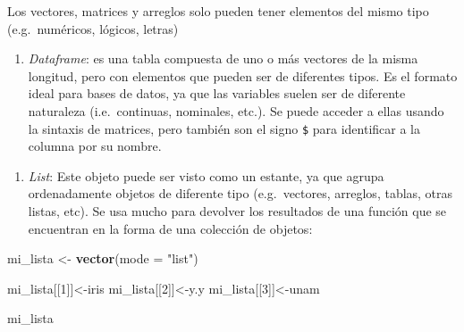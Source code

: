 \documentclass[]{article}
\newenvironment{Shaded}{\begin{snugshade}}{\end{snugshade}}
\newcommand{\CommentTok}[1]{\textcolor[rgb]{0.56,0.35,0.01}{\textit{#1}}}
\newcommand{\DataTypeTok}[1]{\textcolor[rgb]{0.13,0.29,0.53}{#1}}
\newcommand{\DecValTok}[1]{\textcolor[rgb]{0.00,0.00,0.81}{#1}}
\newcommand{\KeywordTok}[1]{\textcolor[rgb]{0.13,0.29,0.53}{\textbf{#1}}}
\newcommand{\NormalTok}[1]{#1}
\newcommand{\OperatorTok}[1]{\textcolor[rgb]{0.81,0.36,0.00}{\textbf{#1}}}
\newcommand{\StringTok}[1]{\textcolor[rgb]{0.31,0.60,0.02}{#1}}
\providecommand{\tightlist}{%
  \setlength{\itemsep}{0pt}\setlength{\parskip}{0pt}}
\begin{document}
Los vectores, matrices y arreglos solo pueden tener elementos del mismo
tipo (e.g.~numéricos, lógicos, letras)

\begin{enumerate}
\def\labelenumi{\Alph{enumi})}
\setcounter{enumi}{3}
\tightlist
\item
  \emph{Dataframe}: es una tabla compuesta de uno o más vectores de la
  misma longitud, pero con elementos que pueden ser de diferentes tipos.
  Es el formato ideal para bases de datos, ya que las variables suelen
  ser de diferente naturaleza (i.e.~continuas, nominales, etc.). Se
  puede acceder a ellas usando la sintaxis de matrices, pero también son
  el signo \texttt{\$} para identificar a la columna por su nombre.
\end{enumerate}

\begin{Shaded}
\end{Shaded}

\begin{enumerate}
\def\labelenumi{\Alph{enumi})}
\setcounter{enumi}{4}
\tightlist
\item
  \emph{List}: Este objeto puede ser visto como un estante, ya que
  agrupa ordenadamente objetos de diferente tipo (e.g.~vectores,
  arreglos, tablas, otras listas, etc). Se usa mucho para devolver los
  resultados de una función que se encuentran en la forma de una
  colección de objetos:
\end{enumerate}

\begin{Shaded}
\begin{Highlighting}[]
\NormalTok{mi_lista <-}\StringTok{ }\KeywordTok{vector}\NormalTok{(}\DataTypeTok{mode =} \StringTok{"list"}\NormalTok{)}

\NormalTok{mi_lista[[}\DecValTok{1}\NormalTok{]]<-iris}
\NormalTok{mi_lista[[}\DecValTok{2}\NormalTok{]]<-y.y}
\NormalTok{mi_lista[[}\DecValTok{3}\NormalTok{]]<-unam}

\NormalTok{mi_lista}
\end{Highlighting}
\end{Shaded}
\end{document}
